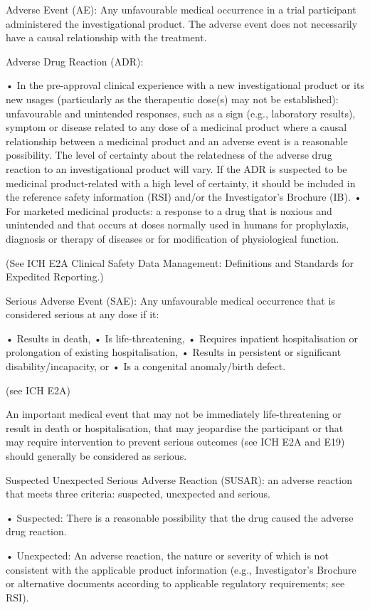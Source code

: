 \documentclass[11pt]{article}
\begin{document}
Adverse Event (AE): Any unfavourable medical occurrence in a trial participant administered the investigational product. The adverse event does not necessarily have a causal relationship with the treatment.


Adverse Drug Reaction (ADR):


• In the pre-approval clinical experience with a new investigational product or its new usages (particularly as the therapeutic dose(s) may not be established): unfavourable and unintended responses, such as a sign (e.g., laboratory results), symptom or disease related to any dose of a medicinal product where a causal relationship between a medicinal product and an adverse event is a reasonable possibility. The level of certainty about the relatedness of the adverse drug reaction to an investigational product will vary. If the ADR is suspected to be medicinal product-related with a high level of certainty, it should be included in the reference safety information (RSI) and/or the Investigator's Brochure (IB). • For marketed medicinal products: a response to a drug that is noxious and unintended and that occurs at doses normally used in humans for prophylaxis, diagnosis or therapy of diseases or for modification of physiological function.


(See ICH E2A Clinical Safety Data Management: Definitions and Standards for Expedited Reporting.)


Serious Adverse Event (SAE): Any unfavourable medical occurrence that is considered serious at any dose if it:


• Results in death, • Is life-threatening, • Requires inpatient hospitalisation or prolongation of existing hospitalisation, • Results in persistent or significant disability/incapacity, or • Is a congenital anomaly/birth defect.


(see ICH E2A)


An important medical event that may not be immediately life-threatening or result in death or hospitalisation, that may jeopardise the participant or that may require intervention to prevent serious outcomes (see ICH E2A and E19) should generally be considered as serious.


Suspected Unexpected Serious Adverse Reaction (SUSAR): an adverse reaction that meets three criteria: suspected, unexpected and serious.


• Suspected: There is a reasonable possibility that the drug caused the adverse drug reaction.


• Unexpected: An adverse reaction, the nature or severity of which is not consistent with the applicable product information (e.g., Investigator's Brochure or alternative documents according to applicable regulatory requirements; see RSI).
\end{document}
